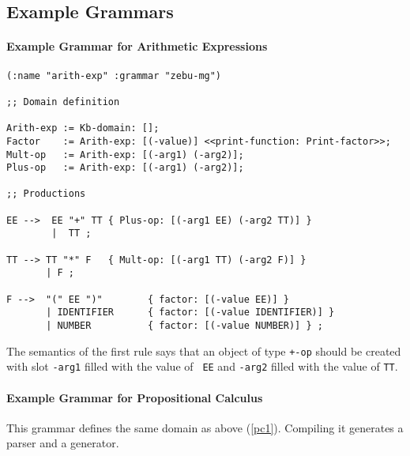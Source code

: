 \subsection {Example Grammars}

\paragraph {Example Grammar for Arithmetic Expressions}

{\tt \begin{verbatim}
(:name "arith-exp" :grammar "zebu-mg")

;; Domain definition

Arith-exp := Kb-domain: [];
Factor    := Arith-exp: [(-value)] <<print-function: Print-factor>>;
Mult-op   := Arith-exp: [(-arg1) (-arg2)];
Plus-op   := Arith-exp: [(-arg1) (-arg2)];

;; Productions

EE -->  EE "+" TT { Plus-op: [(-arg1 EE) (-arg2 TT)] }
        |  TT ;

TT --> TT "*" F   { Mult-op: [(-arg1 TT) (-arg2 F)] }
       | F ;

F -->  "(" EE ")"        { factor: [(-value EE)] }
       | IDENTIFIER      { factor: [(-value IDENTIFIER)] }
       | NUMBER          { factor: [(-value NUMBER)] } ;

\end{verbatim}}

The semantics of the first rule says that an object of type {\tt +-op}
should be created with slot {\tt -arg1} filled with the value of {\tt
EE} and {\tt -arg2} filled with the value of {\tt TT}.

\paragraph {Example Grammar for Propositional Calculus}

This grammar defines the same domain as above (\ref{pc1}).  Compiling
it generates a parser and a generator. 

